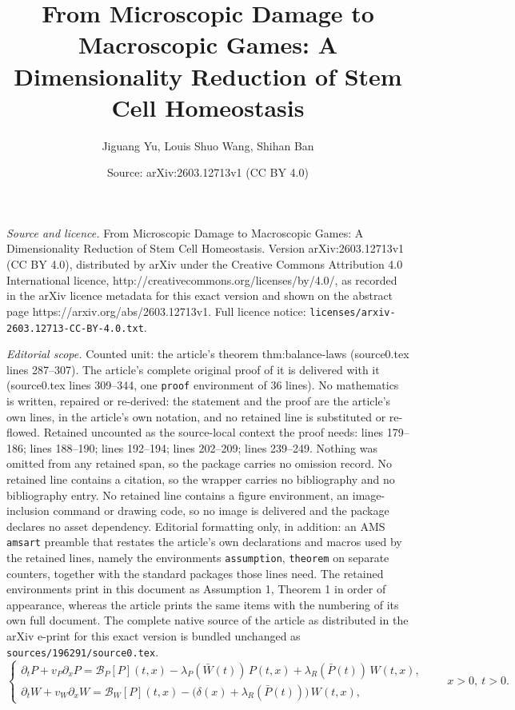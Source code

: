 \documentclass[10pt,a4paper]{amsart}
\title{From Microscopic Damage to Macroscopic Games: A Dimensionality Reduction of Stem Cell Homeostasis}
\author{Jiguang Yu, Louis Shuo Wang, Shihan Ban}
\date{Source: arXiv:2603.12713v1 (CC BY 4.0)}
\begin{document}
\maketitle

\noindent\emph{Source and licence.} From Microscopic Damage to Macroscopic Games: A Dimensionality Reduction of Stem Cell Homeostasis. Version arXiv:2603.12713v1 (CC BY 4.0), distributed by arXiv under the Creative Commons Attribution 4.0 International licence, http://creativecommons.org/licenses/by/4.0/, as recorded in the arXiv licence metadata for this exact version and shown on the abstract page https://arxiv.org/abs/2603.12713v1. Full licence notice: \texttt{licenses/arxiv-2603.12713-CC-BY-4.0.txt}.\par\smallskip

\noindent\textit{Editorial scope.} Counted unit: the article's theorem thm:balance-laws (source0.tex lines 287--307). The article's complete original proof of it is delivered with it (source0.tex lines 309--344, one \texttt{proof} environment of 36 lines). No mathematics is written, repaired or re-derived: the statement and the proof are the article's own lines, in the article's own notation, and no retained line is substituted or re-flowed.  Retained uncounted as the source-local context the proof needs: lines 179--186; lines 188--190; lines 192--194; lines 202--209; lines 239--249.  Nothing was omitted from any retained span, so the package carries no omission record.  No retained line contains a citation, so the wrapper carries no bibliography and no bibliography entry.  No retained line contains a figure environment, an image-inclusion command or drawing code, so no image is delivered and the package declares no asset dependency.  Editorial formatting only, in addition: an AMS \texttt{amsart} preamble that restates the article's own declarations and macros used by the retained lines, namely the environments \texttt{assumption}, \texttt{theorem} on separate counters, together with the standard packages those lines need.  The retained environments print in this document as Assumption 1, Theorem 1 in order of appearance, whereas the article prints the same items with the numbering of its own full document.  The complete native source of the article as distributed in the arXiv e-print for this exact version is bundled unchanged as \texttt{sources/196291/source0.tex}.
\begin{equation}\label{eq:PDE_model}
\begin{cases}
\partial_t P + v_P \partial_x P
= \mathcal B_P[P](t,x) - \lambda_P(\bar W(t))\,P(t,x) + \lambda_R(\bar P(t))\,W(t,x),\\[4pt]
\partial_t W + v_W \partial_x W
= \mathcal B_W[P](t,x) - \big(\delta(x)+\lambda_R(\bar P(t))\big)\,W(t,x),
\end{cases} \qquad x>0,\ t>0.
\end{equation}
\end{document}
